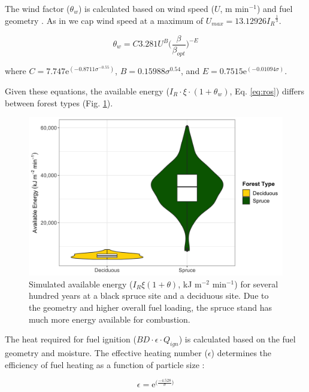 \documentclass[a4paper, 12pt] {report}
\begin{document}
The wind factor ($\theta_w$) is calculated based on wind speed ($U$, m min$^{-1}$) and fuel geometry \cite{thonickeInfluenceVegetationFire2010, rothermelMathematicalModelPredicting1972}. As in  we cap wind speed at a maximum of $U_{max} = 13.12926{I_R}^{\frac{1}{3}}$.

\begin{equation}
	\theta_w = C3.281U^B\Big(\frac{\beta}{\beta_{opt}}\Big)^{-E}
\end{equation}

where $C = 7.747\text{e}^{(-0.8711\sigma^{-0.55})}$, $B = 0.15988\sigma^{0.54}$, and $E = 0.7515\text{e}^{(-0.01094\sigma)}$.

Given these equations, the available energy ($I_R \cdot \xi \cdot (1 + \theta_w)$, Eq. \ref{eq:ros}) differs between forest types (Fig. \ref{fig:energy}).

\begin{figure}
	\includegraphics[width=\linewidth]{figures/avail_energy.png}
	\caption{Simulated available energy ($I_R\xi(1 + \theta)$, kJ m$^{-2}$ min$^{-1}$) for several hundred years at a black spruce site and a deciduous site. Due to the geometry and higher overall fuel loading, the spruce stand has much more energy available for combustion.}
	\label{fig:energy}
\end{figure}


The heat required for fuel ignition ($BD \cdot \epsilon \cdot Q_{ign}$) is calculated based on the fuel geometry and moisture. The effective heating number ($\epsilon$) determines the efficiency of fuel heating as a function of particle size \cite{rothermelMathematicalModelPredicting1972}:

\begin{equation}
	\epsilon = \text{e}^{\Big(\frac{-4.528}{\sigma}\Big)}
\end{equation}
\end{document}
